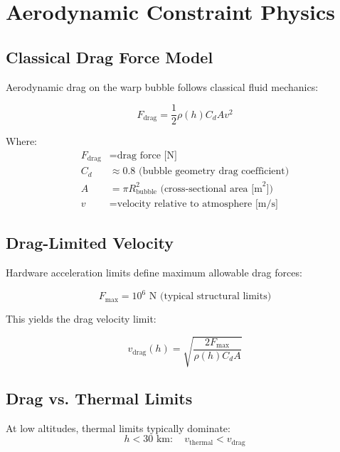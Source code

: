 \documentclass[12pt,a4paper]{article}
\begin{document}
\section{Aerodynamic Constraint Physics}

\subsection{Classical Drag Force Model}

Aerodynamic drag on the warp bubble follows classical fluid mechanics:

\begin{equation}
F_{\text{drag}} = \frac{1}{2} \rho(h) C_d A v^2
\end{equation}

Where:
\begin{align}
F_{\text{drag}} &= \text{drag force [N]} \\
C_d &\approx 0.8 \text{ (bubble geometry drag coefficient)} \\
A &= \pi R_{\text{bubble}}^2 \text{ (cross-sectional area [m}^2\text{])} \\
v &= \text{velocity relative to atmosphere [m/s]}
\end{align}

\subsection{Drag-Limited Velocity}

Hardware acceleration limits define maximum allowable drag forces:

\begin{equation}
F_{\max} = 10^6 \text{ N (typical structural limits)}
\end{equation}

This yields the drag velocity limit:

\begin{equation}
v_{\text{drag}}(h) = \sqrt{\frac{2 F_{\max}}{\rho(h) C_d A}}
\end{equation}

\subsection{Drag vs. Thermal Limits}

At low altitudes, thermal limits typically dominate:
\begin{equation}
h < 30 \text{ km}: \quad v_{\text{thermal}} < v_{\text{drag}}
\end{equation}
\end{document}

